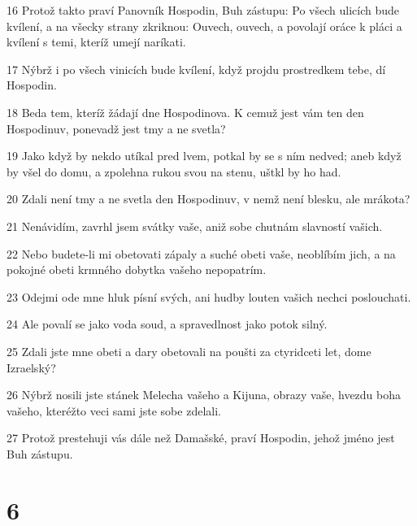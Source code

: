 \par 16 Protož takto praví Panovník Hospodin, Buh zástupu: Po všech ulicích bude kvílení, a na všecky strany zkriknou: Ouvech, ouvech, a povolají oráce k pláci a kvílení s temi, kteríž umejí naríkati.
\par 17 Nýbrž i po všech vinicích bude kvílení, když projdu prostredkem tebe, dí Hospodin.
\par 18 Beda tem, kteríž žádají dne Hospodinova. K cemuž jest vám ten den Hospodinuv, ponevadž jest tmy a ne svetla?
\par 19 Jako když by nekdo utíkal pred lvem, potkal by se s ním nedved; aneb když by všel do domu, a zpolehna rukou svou na stenu, uštkl by ho had.
\par 20 Zdali není tmy a ne svetla den Hospodinuv, v nemž není blesku, ale mrákota?
\par 21 Nenávidím, zavrhl jsem svátky vaše, aniž sobe chutnám slavností vašich.
\par 22 Nebo budete-li mi obetovati zápaly a suché obeti vaše, neoblíbím jich, a na pokojné obeti krmného dobytka vašeho nepopatrím.
\par 23 Odejmi ode mne hluk písní svých, ani hudby louten vašich nechci poslouchati.
\par 24 Ale povalí se jako voda soud, a spravedlnost jako potok silný.
\par 25 Zdali jste mne obeti a dary obetovali na poušti za ctyridceti let, dome Izraelský?
\par 26 Nýbrž nosili jste stánek Melecha vašeho a Kijuna, obrazy vaše, hvezdu boha vašeho, kteréžto veci sami jste sobe zdelali.
\par 27 Protož prestehuji vás dále než Damašské, praví Hospodin, jehož jméno jest Buh zástupu.

\chapter{6}

